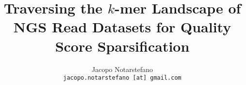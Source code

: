 \documentclass[12pt]{beamer}
\title{Traversing the \(k\)-mer Landscape of NGS Read Datasets for Quality Score Sparsification}
\author[Jacopo Notarstefano]{
    Jacopo Notarstefano\\
    \texttt{jacopo.notarstefano [at] gmail.com}
}
\date{}
\begin{document}
    \begin{frame}[plain]
        \titlepage
    \end{frame}

    \begin{frame}{}
    \end{frame}
\end{document}
